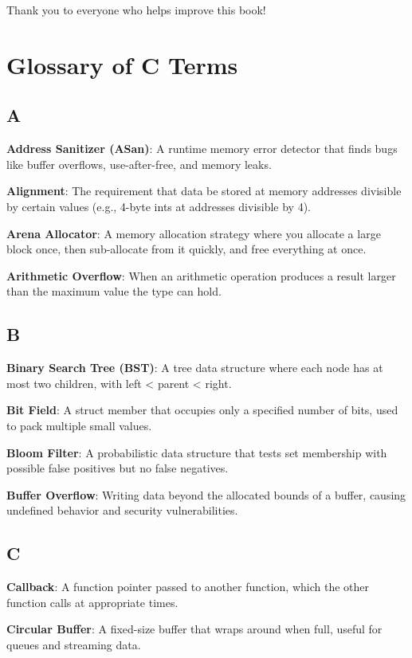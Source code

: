 \documentclass[10pt,openany]{book}
\begin{document}
Thank you to everyone who helps improve this book!

\chapter{Glossary of C Terms}

\section*{A}

\textbf{Address Sanitizer (ASan)}: A runtime memory error detector that finds bugs like buffer overflows, use-after-free, and memory leaks.

\textbf{Alignment}: The requirement that data be stored at memory addresses divisible by certain values (e.g., 4-byte ints at addresses divisible by 4).

\textbf{Arena Allocator}: A memory allocation strategy where you allocate a large block once, then sub-allocate from it quickly, and free everything at once.

\textbf{Arithmetic Overflow}: When an arithmetic operation produces a result larger than the maximum value the type can hold.

\section*{B}

\textbf{Binary Search Tree (BST)}: A tree data structure where each node has at most two children, with left < parent < right.

\textbf{Bit Field}: A struct member that occupies only a specified number of bits, used to pack multiple small values.

\textbf{Bloom Filter}: A probabilistic data structure that tests set membership with possible false positives but no false negatives.

\textbf{Buffer Overflow}: Writing data beyond the allocated bounds of a buffer, causing undefined behavior and security vulnerabilities.

\section*{C}

\textbf{Callback}: A function pointer passed to another function, which the other function calls at appropriate times.

\textbf{Circular Buffer}: A fixed-size buffer that wraps around when full, useful for queues and streaming data.
\end{document}
